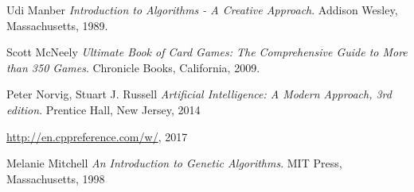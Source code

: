 \documentclass[a4paper, 12pt, ngerman]{article}
\begin{document}
\begin{thebibliography}{100}
Udi Manber
\textit{Introduction to Algorithms - A Creative Approach}.
Addison Wesley, Massachusetts, 1989.

Scott McNeely 
\textit{Ultimate Book of Card Games: The Comprehensive Guide to More than 350 Games}.
Chronicle Books, California, 2009.

Peter Norvig, Stuart J. Russell
\textit{Artificial Intelligence: A Modern Approach, 3rd edition}.
Prentice Hall, New Jersey, 2014

\url{http://en.cppreference.com/w/}, 2017

Melanie Mitchell
\textit{An Introduction to Genetic Algorithms}.
MIT Press, Massachusetts, 1998

\end{thebibliography}
\end{document}
